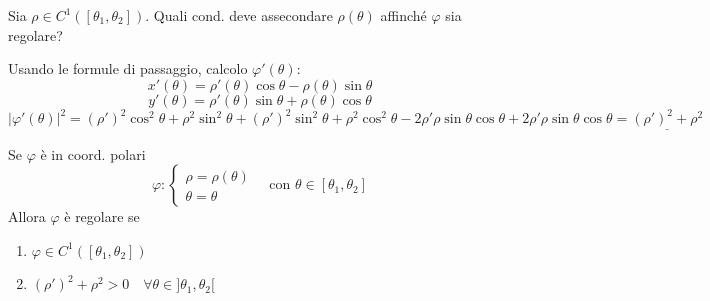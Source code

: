 Sia $\rho \in C^1([\theta_1, \theta_2])$. Quali cond. deve assecondare $\rho(\theta)$ affinché $\varphi$ sia regolare?

Usando le formule di passaggio, calcolo $\varphi'(\theta)$:
\[
x'(\theta) = \rho'(\theta) \cos\theta - \rho(\theta) \sin\theta
\]
\[
y'(\theta) = \rho'(\theta) \sin\theta + \rho(\theta) \cos\theta
\]
\[
\vert \varphi'(\theta) \vert^2 = (\rho')^2 \cos^2\theta + \rho^2 \sin^2\theta + (\rho')^2 \sin^2\theta + \rho^2 \cos^2\theta - 2\rho'\rho \sin\theta \cos\theta + 2\rho'\rho \sin\theta \cos\theta = \underline{(\rho')^2 + \rho^2}
\]

\begin{prop}
Se $\varphi$ è in coord. polari
\[
\varphi : \begin{cases}
\rho = \rho(\theta) \\
\theta = \theta
\end{cases} \quad \text{con } \theta \in [\theta_1, \theta_2]
\]
Allora $\varphi$ è regolare se
\begin{enumerate}
    \item $\varphi \in C^1([\theta_1, \theta_2])$
    \item $(\rho')^2 + \rho^2 > 0 \quad \forall \theta \in ]\theta_1, \theta_2[$
\end{enumerate}
\end{prop}

\begin{example*}
\end{example*}

